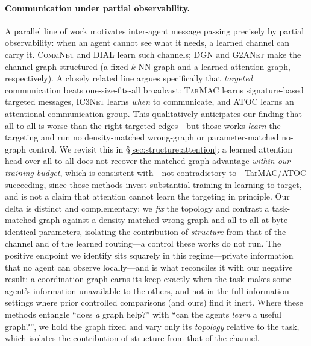 \documentclass[10pt]{article}
\newcommand{\algoname}[1]{\textsc{#1}}
\begin{document}
\paragraph{Communication under partial observability.} A parallel line of
work motivates inter-agent message passing precisely by partial
observability: when an agent cannot see what it needs, a learned channel can
carry it. \algoname{CommNet} \citep{sukhbaatar_2016_commnet} and
\algoname{DIAL} \citep{foerster_2016_rial_dial} learn such channels;
\algoname{DGN} \citep{jiang_2020_dgn} and \algoname{G2ANet}
\citep{liu_2020_g2anet} make the channel graph-structured (a fixed $k$-NN
graph and a learned attention graph, respectively). A closely related line
argues specifically that \emph{targeted} communication beats one-size-fits-all
broadcast: \algoname{TarMAC} \citep{das_2019_tarmac} learns signature-based
targeted messages, \algoname{IC3Net} \citep{singh_2019_ic3net} learns
\emph{when} to communicate, and \algoname{ATOC} \citep{jiang_2018_atoc} learns
an attentional communication group. This qualitatively anticipates our
finding that all-to-all is worse than the right targeted edges---but those
works \emph{learn} the targeting and run no density-matched wrong-graph or
parameter-matched no-graph control. We revisit this in
\S\ref{sec:structure:attention}: a learned attention head over all-to-all does
not recover the matched-graph advantage \emph{within our training budget},
which is consistent with---not contradictory to---TarMAC/ATOC succeeding, since
those methods invest substantial training in learning to target, and is not a
claim that attention cannot learn the targeting in principle. Our delta is distinct and complementary:
we \emph{fix} the topology and contrast a task-matched graph against a
density-matched wrong graph and all-to-all at byte-identical parameters,
isolating the contribution of \emph{structure} from that of the channel and of
the learned routing---a control these works do not run.
The positive endpoint we
identify sits squarely in this regime---private information that no agent can
observe locally---and is what reconciles it with our negative result: a
coordination graph earns its keep exactly when the task makes some agent's
information unavailable to the others, and not in the full-information
settings where prior controlled comparisons (and ours) find it inert. Where
these methods entangle ``does \emph{a} graph help?'' with ``can the agents
\emph{learn} a useful graph?'', we hold the graph fixed and vary only its
\emph{topology} relative to the task, which isolates the contribution of
structure from that of the channel.
\end{document}
